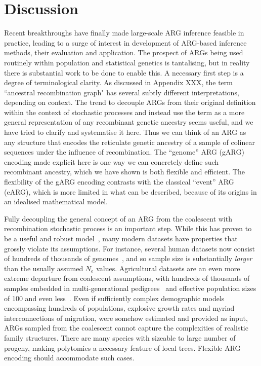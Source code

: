 \documentclass{article}
\begin{document}
\section*{Discussion}
Recent breakthroughs have finally made large-scale ARG inference
feasible in practice, leading to a surge of interest
in development of ARG-based inference methods, their evaluation
and application.
The prospect of ARGs being used routinely within population
and statistical genetics is tantalising,
but in reality there is substantial work to be done to
enable this.
A necessary first step is a degree of terminological clarity.
As discussed in Appendix XXX, the term ``ancestral recombination
graph" has several
subtly different interpretations, depending on context.
The trend to decouple ARGs from their original definition
within the context of stochastic
processes and instead use the term as a more general representation of any
recombinant genetic ancestry seems useful, and we have
tried to clarify and systematise it here. Thus
we can think of an ARG as any structure that encodes the
reticulate genetic ancestry of a sample of colinear sequences under
the influence of recombination. The ``genome'' ARG (gARG) encoding
made explicit here is one way we can concretely
define such recombinant ancestry, which we have shown is both
flexible and efficient.
The flexibility of the gARG encoding contrasts with the classical
``event'' ARG (eARG), which is more limited in what can be described, because of its origins in an idealised mathematical model.

Fully decoupling the general concept of an ARG from the coalescent
with recombination stochastic process is an important step.
While this has proven to be a useful and
robust
model~\citep{wakeley2012gene,bhaskar2014distortion,nelson2020accounting},
many modern datasets have properties that grossly
violate its assumptions.
For instance, several human datasets now consist of hundreds of thousands of
genomes~\citep{bycroft2018genome,karczewski2020mutational,tanjo2021practical},
and so sample size is substantially \emph{larger} than the
usually assumed $N_e$ values.
Agricultural datasets are an even more extreme departure from coalescent
assumptions, with hundreds of thousands of samples embedded in
multi-generational pedigrees~\citep{hayes20191000,Ros-Freixedes2020}
and effective population sizes of 100 and even
less~\citep{MacLeod2013,Makanjuola2020,Hall2016,Porcnic2016}.
Even if sufficiently complex demographic models~\citep{gower2022demes}
encompassing hundreds of populations, explosive growth rates and
myriad interconnections of migration, were somehow estimated and
provided as input, ARGs sampled from
the coalescent cannot capture the complexities of realistic family structures. There are many species with sizeable to large number of progeny, making polytomies a necessary feature of local trees. Flexible ARG encoding should accommodate such cases.
\end{document}
